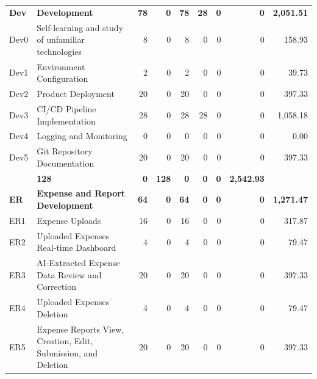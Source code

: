 \begin{longtable}{@{}l p{8.5cm} r r r r r r r@{}}
\rowcolor{gray!20}
\textbf{Dev} & \textbf{Development} & \textbf{78} & \textbf{0} & \textbf{78} & \textbf{28} & \textbf{0} & \textbf{0} & \textbf{2,051.51} \\
\rowcolor{gray!05}
Dev0 & Self-learning and study of unfamiliar technologies & 8 & 0 & 8 & 0 & 0 & 0 & 158.93 \\
\rowcolor{gray!05}
Dev1 & Environment Configuration & 2 & 0 & 2 & 0 & 0 & 0 & 39.73 \\
\rowcolor{gray!05}
Dev2 & Product Deployment & 20 & 0 & 20 & 0 & 0 & 0 & 397.33 \\
\rowcolor{gray!05}
Dev3 & CI/CD Pipeline Implementation & 28 & 0 & 28 & 28 & 0 & 0 & 1,058.18 \\
\rowcolor{gray!05}
Dev4 & Logging and Monitoring & 0 & 0 & 0 & 0 & 0 & 0 & 0.00 \\
\rowcolor{gray!05}
Dev5 & Git Repository Documentation & 20 & 0 & 20 & 0 & 0 & 0 & 397.33 \\

\rowcolor{gray!20}
\multicolumn{2}{l}{\textbf{Frontend and Backend Development}} & \textbf{128} & \textbf{0} & 
\textbf{128} & \textbf{0} & \textbf{0} & \textbf{0} & \textbf{2,542.93} \\

\rowcolor{gray!10}
\textbf{ER} & \textbf{Expense and Report Development} & \textbf{64} & \textbf{0} & \textbf{64} & \textbf{0} & \textbf{0} & \textbf{0} & \textbf{1,271.47} \\
\rowcolor{gray!05}
ER1 & Expense Uploads & 16 & 0 & 16 & 0 & 0 & 0 & 317.87 \\
\rowcolor{gray!05}
ER2 & Uploaded Expenses Real-time Dashboard & 4 & 0 & 4 & 0 & 0 & 0 & 79.47 \\
\rowcolor{gray!05}
ER3 & AI-Extracted Expense Data Review and Correction & 20 & 0 & 20 & 0 & 0 & 0 & 397.33 \\
\rowcolor{gray!05}
ER4 & Uploaded Expenses Deletion & 4 & 0 & 4 & 0 & 0 & 0 & 79.47 \\
\rowcolor{gray!05}
ER5 & Expense Reports View, Creation, Edit, Submission, and Deletion & 20 & 0 & 20 & 0 & 0 & 0 & 397.33 \\


\end{longtable}
